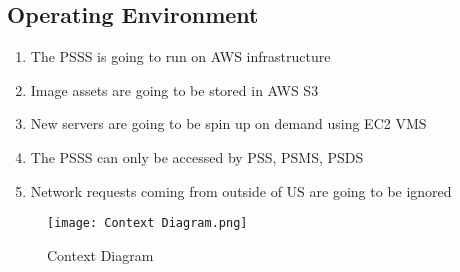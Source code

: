 \subsection{Operating Environment}
\begin{enumerate}[label=OE-\arabic*]
    \item The PSSS is going to run on AWS infrastructure
    \item Image assets are going to be stored in AWS S3
    \item New servers are going to be spin up on demand using EC2 VMS
    \item The PSSS can only be accessed by PSS, PSMS, PSDS 
    \item Network requests coming from outside of US are going to be ignored
\end{enumerate}
\begin{figure}[!htb]
    \centering
    \texttt{[image: Context Diagram.png]}
    \caption{Context Diagram}
\end{figure}